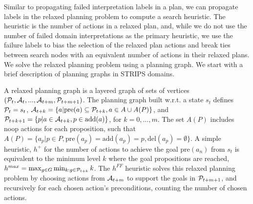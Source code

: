 \documentclass{article}
\def\citep#1{\cite{#1}}
\def\und#1{\noindent{\bf #1}:}
\def\und#1{\medskip{\noindent\bf #1:}}
\begin{document}
Similar to propagating failed interpretation labels in a plan, we can propagate labels in the relaxed planning problem to compute a search heuristic.  The heuristic is the number of actions in a relaxed plan, and, while we do not use the number of failed domain interpretations as the primary heuristic, we use the failure labels to bias the selection of the relaxed plan actions and break ties between search nodes with an equivalent number of actions in their relaxed plans.  We solve the relaxed planning problem using a planning graph.  We start with a brief description of planning graphs in STRIPS domains.

\und{Planning Graph Heuristics}   A relaxed planning graph  is a layered graph of sets of vertices $({\cal P}_t, {\cal A}_t, ..., {\cal A}_{t+m}, {\cal P}_{t+m+1})$.  The planning graph built w.r.t. a state $s_t$ defines ${\cal P}_t = s_t$, ${\cal A}_{t+k} = \{ a | \text{pre}(a) \subseteq {\cal P}_{t+k}, a \in A \cup A(P)\}$, and ${\cal P}_{t+k+1} = \{p | a \in {\cal A}_{t+k}, p \in \text{add}(a)\}$, for $k = 0, ..., m$.  The set $A(P)$ includes noop actions for each proposition, such that $A(P) = \{a_p | p \in P, \text{pre}(a_p) =\text{add}(a_p)=p, \text{del}(a_p)=\emptyset\}$.
A simple heuristic, $h^{+}$ for the number of actions to achieve the goal $\text{pre}(a_{n})$ from $s_t$ is equivalent to the minimum level $k$ where the goal propositions are reached,  $h^{max} =\max_{g \in G} \min_{k: g \in {\cal P}_{t+k}} k$.  The $h^{FF}$  heuristic \citep{hoffmann:nebel:jair-01} solves this relaxed planning problem by choosing actions from ${\cal A}_{t+m}$ to support the goals in ${\cal P}_{t+m+1}$, and recursively for each chosen action's preconditions, counting the number of chosen actions.

\end{document}

